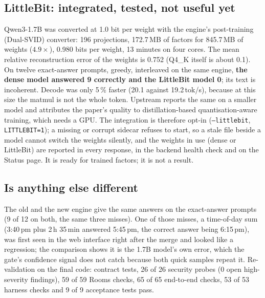 \subsection{LittleBit: integrated, tested, not useful yet}

Qwen3-1.7B was converted at 1.0 bit per weight with the engine's post-training (Dual-SVID) converter: 196 projections, 172.7\,MB of factors for 845.7\,MB
of weights ($4.9\times$), 0.980 bits per weight, 13 minutes on four cores. The mean relative reconstruction error of the weights is 0.752 (Q4\_K itself
is about 0.1). On twelve exact-answer prompts, greedy, interleaved on the same engine, \textbf{the dense model answered 9 correctly and the LittleBit
model 0}; its text is incoherent. Decode was only 5\,\% faster (20.1 against 19.2\,tok/s), because at this size the matmul is not the whole token. Upstream
reports the same on a smaller model and attributes the paper's quality to distillation-based quantisation-aware training, which needs a GPU. The
integration is therefore opt-in (\texttt{--littlebit}, \texttt{LITTLEBIT=1}); a missing or corrupt sidecar refuses to start, so a stale file beside a
model cannot switch the weights silently, and the weights in use (dense or LittleBit) are reported in every response, in the backend health check and
on the Status page. It is ready for trained factors; it is not a result.

\subsection{Is anything else different}

The old and the new engine give the same answers on the exact-answer prompts (9 of 12 on both, the same three misses). One of those misses, a
time-of-day sum (3:40\,pm plus 2\,h 35\,min answered 5:45\,pm, the correct answer being 6:15\,pm), was first seen in the web interface right after the merge and
looked like a regression; the comparison shows it is the 1.7B model's own error, which the gate's confidence signal does not catch because both quick
samples repeat it. Re-validation on the final code: contract tests, 26 of 26 security probes (0 open high-severity findings), 59 of 59 Rooms checks, 65 of 65
end-to-end checks, 53 of 53 harness checks and 9 of 9 acceptance tests pass.
